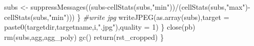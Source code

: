 \documentclass[
]{article}
\newenvironment{Shaded}{\begin{snugshade}}{\end{snugshade}}
\newcommand{\AttributeTok}[1]{\textcolor[rgb]{0.77,0.63,0.00}{#1}}
\newcommand{\CommentTok}[1]{\textcolor[rgb]{0.56,0.35,0.01}{\textit{#1}}}
\newcommand{\DecValTok}[1]{\textcolor[rgb]{0.00,0.00,0.81}{#1}}
\newcommand{\FunctionTok}[1]{\textcolor[rgb]{0.00,0.00,0.00}{#1}}
\newcommand{\NormalTok}[1]{#1}
\newcommand{\OtherTok}[1]{\textcolor[rgb]{0.56,0.35,0.01}{#1}}
\newcommand{\SpecialCharTok}[1]{\textcolor[rgb]{0.00,0.00,0.00}{#1}}
\newcommand{\StringTok}[1]{\textcolor[rgb]{0.31,0.60,0.02}{#1}}
\begin{document}
\begin{Shaded}
\begin{Highlighting}[]
\NormalTok{        subs }\OtherTok{\textless{}{-}} \FunctionTok{suppressMessages}\NormalTok{((subs}\SpecialCharTok{{-}}\FunctionTok{cellStats}\NormalTok{(subs,}\StringTok{"min"}\NormalTok{))}\SpecialCharTok{/}\NormalTok{(}\FunctionTok{cellStats}\NormalTok{(subs,}\StringTok{"max"}\NormalTok{)}\SpecialCharTok{{-}}
                                                                 \FunctionTok{cellStats}\NormalTok{(subs,}\StringTok{"min"}\NormalTok{)))}
\NormalTok{      \}}
      \CommentTok{\#write jpg}
      \FunctionTok{writeJPEG}\NormalTok{(}\FunctionTok{as.array}\NormalTok{(subs),}\AttributeTok{target =} \FunctionTok{paste0}\NormalTok{(targetdir,targetname,i,}\StringTok{".jpg"}\NormalTok{),}\AttributeTok{quality =} \DecValTok{1}\NormalTok{)}
\NormalTok{    \}}
    \FunctionTok{close}\NormalTok{(pb)}
    \FunctionTok{rm}\NormalTok{(subs,agg,agg\_poly)}
    \FunctionTok{gc}\NormalTok{()}
    \FunctionTok{return}\NormalTok{(rst\_cropped)}
\NormalTok{\}}
\end{Highlighting}
\end{Shaded}
\end{document}
